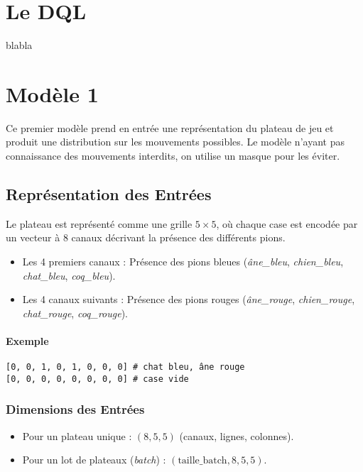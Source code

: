 \documentclass[]{article}
\begin{document}
\section{Le DQL}
blabla

\section{Modèle 1} %
Ce premier modèle prend en entrée une représentation du plateau de jeu et produit une distribution sur les mouvements possibles.
Le modèle n'ayant pas connaissance des mouvements interdits, on utilise un masque pour les éviter.

\subsection{Représentation des Entrées}
Le plateau est représenté comme une grille \(5 \times 5\), où chaque case est encodée par un vecteur à 8 canaux décrivant la présence des différents pions.

\begin{itemize}
    \item Les 4 premiers canaux : Présence des pions bleues (\textit{âne\_bleu}, \textit{chien\_bleu}, \textit{chat\_bleu}, \textit{coq\_bleu}).
    \item Les 4 canaux suivants : Présence des pions rouges (\textit{âne\_rouge}, \textit{chien\_rouge}, \textit{chat\_rouge}, \textit{coq\_rouge}).
\end{itemize}

\paragraph{Exemple}

\begin{verbatim}
[0, 0, 1, 0, 1, 0, 0, 0] # chat bleu, âne rouge
[0, 0, 0, 0, 0, 0, 0, 0] # case vide
\end{verbatim}

\subsubsection{Dimensions des Entrées}
\begin{itemize}
    \item Pour un plateau unique : \((8, 5, 5)\) (canaux, lignes, colonnes).
    \item Pour un lot de plateaux (\textit{batch}) : \((\text{taille\_batch}, 8, 5, 5)\).
\end{itemize}
\end{document}
